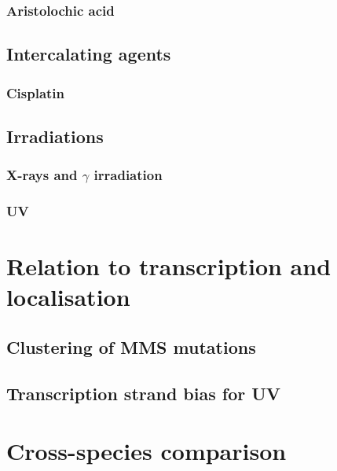 \subsubsection{Aristolochic acid}

\subsection{Intercalating agents}

\subsubsection{Cisplatin}

\subsection{Irradiations}

\subsubsection{X-rays and $\gamma$ irradiation}

\subsubsection{UV}



\section{Relation to transcription and localisation}


\subsection{Clustering of MMS mutations}

\subsection{Transcription strand bias for UV}


\section{Cross-species comparison}

